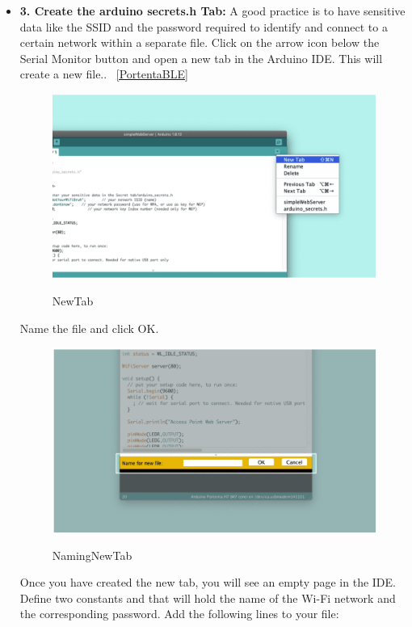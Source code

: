 \begin{itemize}
	
	
	
	\item \textbf{3. Create the arduino secrets.h Tab:} A good practice is to have sensitive data like the SSID and the password required to identify and connect to a certain network within a separate file. Click on the arrow icon below the Serial Monitor button and open a new tab in the Arduino IDE. This will create a new file.. ~\ref{PortentaBLE} \cite{portentaWifiAccessPoint:2024}
	
	\begin{figure}
		\begin{center}
			\includegraphics[width=0.7\linewidth]{Images/WIFI Module/NewTab.png}
			\caption{NewTab}
			\label{NewTab} \cite{portentaWifiAccessPoint:2024}
		\end{center}
	\end{figure}
	
	Name the file  and click OK.
	
	\begin{figure}
		\begin{center}
			\includegraphics[width=0.7\linewidth]{Images/WIFI Module/NamingNewTab.png}
			\caption{NamingNewTab}
			\label{NamingNewTab} \cite{portentaWifiAccessPoint:2024}
		\end{center}
	\end{figure}
	
	Once you have created the new tab, you will see an empty page in the IDE. Define two constants  and  that will hold the name of the Wi-Fi network and the corresponding password. Add the following lines to your  file:
	

\end{itemize}

